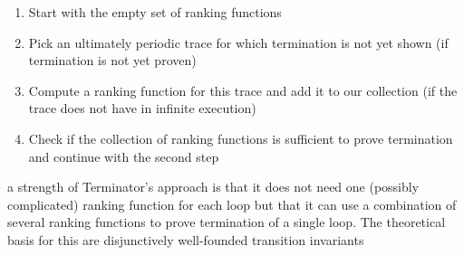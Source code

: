 \documentclass[landscape, a4paper]{article}
\begin{document}
\begin{minipage}[t]{0.2\linewidth}
\begin{betterlist}
\begin{enumerate}
			\item Start with the empty set of ranking functions
			\item Pick an ultimately periodic trace for which termination is not yet shown (if termination is not yet proven)
			\item Compute a ranking function for this trace and add it to our collection (if the trace does not have in infinite execution)
			\item Check if the collection of ranking functions is sufficient to prove termination and continue with the second step
		\end{enumerate}
		\item a strength of Terminator’s approach is that it does not need one (possibly complicated) ranking function for each loop but that it can use a combination of several ranking functions to prove termination of a single loop. The theoretical basis for this are disjunctively well-founded transition invariants
		\item {}


\end{betterlist}
\end{minipage}
\end{document}
